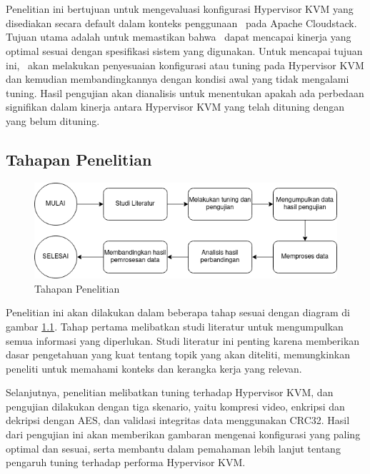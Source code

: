 \chapter{\babTiga}
Penelitian ini bertujuan untuk mengevaluasi konfigurasi Hypervisor KVM yang disediakan secara default dalam konteks penggunaan \vm\ pada Apache Cloudstack. Tujuan utama adalah untuk memastikan bahwa \vm\ dapat mencapai kinerja yang optimal sesuai dengan spesifikasi sistem yang digunakan. Untuk mencapai tujuan ini, \saya\ akan melakukan penyesuaian konfigurasi atau tuning pada Hypervisor KVM dan kemudian membandingkannya dengan kondisi awal yang tidak mengalami tuning. Hasil pengujian akan dianalisis untuk menentukan apakah ada perbedaan signifikan dalam kinerja antara Hypervisor KVM yang telah dituning dengan yang belum dituning.

\section{Tahapan Penelitian}
\begin{figure}
    \centering
    \includegraphics[width=1\textwidth]
    {assets/pics/tahapan-penelitian.png}
    \caption{Tahapan Penelitian}
    \label{fig:TahapanPenelitian}
\end{figure}

Penelitian ini akan dilakukan dalam beberapa tahap sesuai dengan diagram di gambar \ref{fig:TahapanPenelitian}. Tahap pertama melibatkan studi literatur untuk mengumpulkan semua informasi yang diperlukan. Studi literatur ini penting karena memberikan dasar pengetahuan yang kuat tentang topik yang akan diteliti, memungkinkan peneliti untuk memahami konteks dan kerangka kerja yang relevan.

Selanjutnya, penelitian melibatkan tuning terhadap Hypervisor KVM, dan pengujian dilakukan dengan tiga skenario, yaitu kompresi video, enkripsi dan dekripsi dengan AES, dan validasi integritas data menggunakan CRC32. Hasil dari pengujian ini akan memberikan gambaran mengenai konfigurasi yang paling optimal dan sesuai, serta membantu dalam pemahaman lebih lanjut tentang pengaruh tuning terhadap performa Hypervisor KVM.


